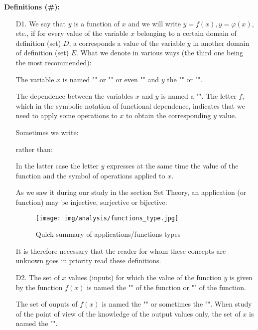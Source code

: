 	\textbf{Definitions (\#\mydef):}
	\begin{enumerate}
		\item[D1.] We say that $y$ is a function of $x$ and we will write $y=f(x),y=\varphi(x)$, etc., if for every value of the variable $x$ belonging to a certain domain of definition (set) $D$, a corresponds a value of the variable $y$ in another domain of definition (set) $E$. What we denote in various ways (the third one being the most recommended):
		
		The variable $x$ is named "" or "" or even "" and $y$ the "" or "".
		
		The dependence between the variables $x$ and $y$ is named a "". The letter $f$, which in the symbolic notation of functional dependence, indicates that we need to apply some operations to $x$ to obtain the corresponding $y$ value.
		
		Sometimes we write:
		
		rather than:
		
		In the latter case the letter $y$ expresses at the same time the value of the function and the symbol of operations applied to $x$.
		\begin{tcolorbox}[title=Remark,colframe=black,arc=10pt]
		As we saw it during our study in the section Set Theory, an application (or function) may be injective, surjective or bijective: 
		\begin{figure}[H]
			\centering
			\texttt{[image: img/analysis/functions\_type.jpg]}
			\caption{Quick summary of applications/functions types}
		\end{figure}
		It is therefore necessary that the reader for whom these concepts are unknown goes in priority read these definitions.
		\end{tcolorbox}
		
		\item[D2.] The set of $x$ values (inputs) for which the value of the function $y$ is given by the function $f (x)$ is named the "" of the function or "" of the function.
		
		The set of ouputs of $f(x)$ is named the "" or sometimes the "". When study of the point of view of the knowledge of the output values only, the set of $x$ is named the "".
		

\end{enumerate}
